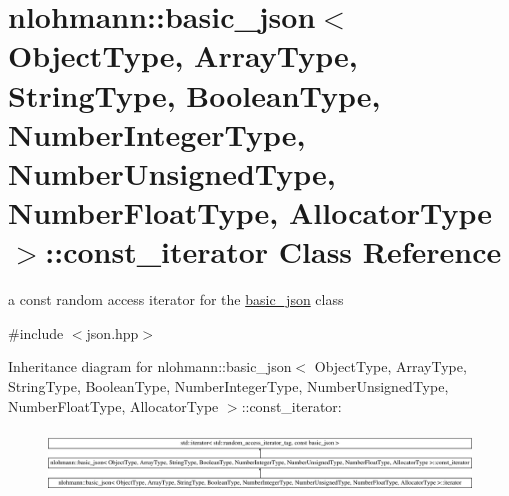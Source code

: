 \hypertarget{classnlohmann_1_1basic__json_1_1const__iterator}{}\section{nlohmann\+:\+:basic\+\_\+json$<$ Object\+Type, Array\+Type, String\+Type, Boolean\+Type, Number\+Integer\+Type, Number\+Unsigned\+Type, Number\+Float\+Type, Allocator\+Type $>$\+:\+:const\+\_\+iterator Class Reference}
\label{classnlohmann_1_1basic__json_1_1const__iterator}


a const random access iterator for the \hyperlink{classnlohmann_1_1basic__json}{basic\+\_\+json} class  




{\ttfamily \#include $<$json.\+hpp$>$}

Inheritance diagram for nlohmann\+:\+:basic\+\_\+json$<$ Object\+Type, Array\+Type, String\+Type, Boolean\+Type, Number\+Integer\+Type, Number\+Unsigned\+Type, Number\+Float\+Type, Allocator\+Type $>$\+:\+:const\+\_\+iterator\+:\begin{figure}[H]
\begin{center}
\leavevmode
\includegraphics[height=1.705584cm]{classnlohmann_1_1basic__json_1_1const__iterator}
\end{center}
\end{figure}
